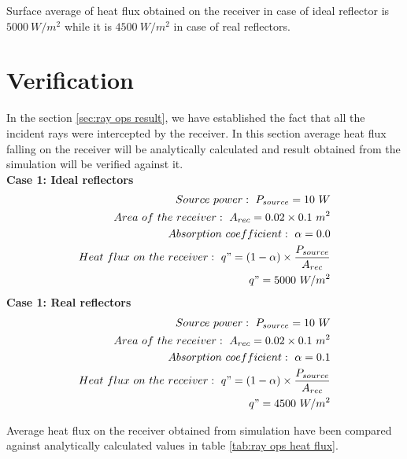 Surface average of heat flux obtained on the receiver in case of ideal reflector is $5000\ W/m^2$ while it is $4500\ W/m^2$ in case of real reflectors.

\section{Verification}\label{sec:ray ops verf}
In the section \ref{sec:ray ops result}, we have established the fact that all the incident rays were intercepted by the receiver. In this section average heat flux falling on the receiver will be analytically calculated and result obtained from the simulation will be verified against it.\\
\textbf{Case 1: Ideal reflectors}\\
\begin{align*}
Source\ power:\ P_{source} = 10\ W \\
Area\ of\ the\ receiver:\ A_{rec} = 0.02\times0.1 \ m^2 \\
Absorption\ coefficient:\ \alpha = 0.0 \\
Heat\ flux\ on\ the\ receiver:\ q" = (1-\alpha)\times\frac{P_{source}}{A_{rec}} \\
q" = 5000\ W/m^2
\end{align*}
\textbf{Case 1: Real reflectors}\\
\begin{align*}
Source\ power:\ P_{source} = 10\ W \\
Area\ of\ the\ receiver:\ A_{rec} = 0.02\times0.1 \ m^2 \\
Absorption\ coefficient:\ \alpha = 0.1 \\
Heat\ flux\ on\ the\ receiver:\ q" = (1-\alpha)\times\frac{P_{source}}{A_{rec}} \\
q" = 4500\ W/m^2
\end{align*}


Average heat flux on the receiver obtained from simulation have been compared against analytically calculated values in table \ref{tab:ray ops heat flux}.

